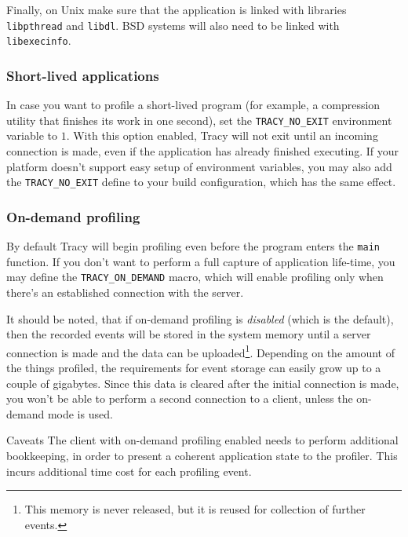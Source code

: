 \documentclass[hidelinks,titlepage,a4paper]{article}
\begin{document}
Finally, on Unix make sure that the application is linked with libraries \texttt{libpthread} and \texttt{libdl}. BSD systems will also need to be linked with \texttt{libexecinfo}.

\subsubsection{Short-lived applications}

In case you want to profile a short-lived program (for example, a compression utility that finishes its work in one second), set the \texttt{TRACY\_NO\_EXIT} environment variable to $1$. With this option enabled, Tracy will not exit until an incoming connection is made, even if the application has already finished executing. If your platform doesn't support easy setup of environment variables, you may also add the \texttt{TRACY\_NO\_EXIT} define to your build configuration, which has the same effect.

\subsubsection{On-demand profiling}
\label{ondemand}

By default Tracy will begin profiling even before the program enters the \texttt{main} function. If you don't want to perform a full capture of application life-time, you may define the \texttt{TRACY\_ON\_DEMAND} macro, which will enable profiling only when there's an established connection with the server.

It should be noted, that if on-demand profiling is \emph{disabled} (which is the default), then the recorded events will be stored in the system memory until a server connection is made and the data can be uploaded\footnote{This memory is never released, but it is reused for collection of further events.}. Depending on the amount of the things profiled, the requirements for event storage can easily grow up to a couple of gigabytes. Since this data is cleared after the initial connection is made, you won't be able to perform a second connection to a client, unless the on-demand mode is used.

\begin{bclogo}[
noborder=true,
couleur=black!5,
logo=\bcattention
]{Caveats}
The client with on-demand profiling enabled needs to perform additional bookkeeping, in order to present a coherent application state to the profiler. This incurs additional time cost for each profiling event.
\end{bclogo}
\end{document}
